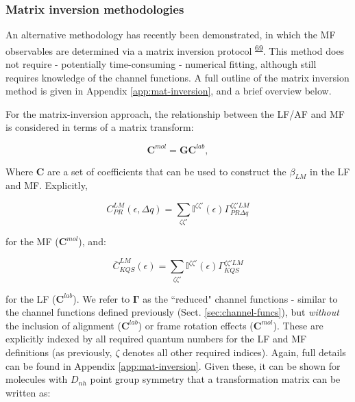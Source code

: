 \documentclass[10pt]{article}
\begin{document}
\subsubsection{Matrix inversion methodologies\label{sec:matrix-inv-intro}}

An alternative methodology has recently been demonstrated, in which the MF observables are determined via a matrix inversion protocol \textsuperscript{\hyperref[csl:69]{69}}. This method does not require - potentially time-consuming - numerical fitting, although still requires knowledge of the channel functions. A full outline of the matrix inversion method is given in Appendix \ref{app:mat-inversion}, and a brief overview below.

For the matrix-inversion approach, the relationship between the LF/AF and MF is considered in terms of a matrix transform:

\begin{equation}
\mathbf{C}^{mol}=\mathbf{G}\mathbf{C}^{lab},\label{eq:basic}
\end{equation}

Where $\mathbf{C}$ are a set of coefficients that can be used to construct the $\beta_{LM}$ in the LF and MF. Explicitly, 


\begin{equation}
C_{PR}^{LM}(\epsilon,\Delta q)=\sum_{\zeta\zeta'}\mathbb{I}^{\zeta\zeta'}(\epsilon)\Gamma_{PR\Delta q}^{\zeta\zeta'LM}
\end{equation}

for the MF ($\mathbf{C}^{mol}$), and:

\begin{equation}
\bar{C}_{KQS}^{LM}(\epsilon)=\sum_{\zeta\zeta'}\mathbb{I}^{\zeta\zeta'}(\epsilon)\Gamma_{KQS}^{\zeta\zeta'LM}
\label{eq:C-AF}
\end{equation}

for the LF ($\mathbf{C}^{lab}$). We refer to $\mathbf{\Gamma}$ as the ``reduced" channel functions - similar to the channel functions defined previously (Sect. \ref{sec:channel-funcs}), but \textit{without} the inclusion of alignment ($\mathbf{C}^{lab}$) or frame rotation effects ($\mathbf{C}^{mol}$). These are explicitly indexed by all required quantum numbers for the LF and MF definitions (as previously, $\zeta$ denotes all other required indices). Again, full details can be found in Appendix \ref{app:mat-inversion}. Given these, it can be shown for molecules with $D_{nh}$ point group symmetry that a transformation matrix can be written as:
\end{document}
